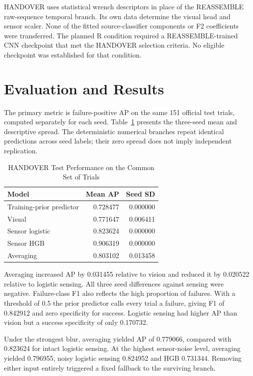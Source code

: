HANDOVER uses statistical wrench descriptors in place of the REASSEMBLE raw-sequence
temporal branch. Its own data determine the visual head and sensor scaler. None of the
fitted source-classifier components or F2 coefficients were transferred. The planned R
condition required a REASSEMBLE-trained CNN checkpoint that met the HANDOVER selection
criteria. No eligible checkpoint was established for that condition.

\section{Evaluation and Results}
The primary metric is failure-positive AP on the same 151 official test trials, computed
separately for each seed. Table~\ref{tab:handover-clean} presents the three-seed mean
and descriptive spread. The deterministic numerical branches repeat identical
predictions across seed labels; their zero spread does not imply independent
replication.

\begin{table}[htbp]
\caption{HANDOVER Test Performance on the Common Set of Trials}\label{tab:handover-clean}
\centering\small

\begin{tabular}{lrr}\hline Model&Mean AP&Seed SD\\\hline
Training-prior predictor&0.728477&0.000000\\
Visual&0.771647&0.006411\\
Sensor logistic&0.823624&0.000000\\
Sensor HGB&0.906319&0.000000\\
Averaging&0.803102&0.013458\\\hline
\end{tabular}
\end{table}

Averaging increased AP by 0.031455 relative to vision and reduced it by 0.020522
relative to logistic sensing. All three seed differences against sensing were negative.
Failure-class F1 also reflects the high proportion of failures. With a threshold of 0.5
the prior predictor calls every trial a failure, giving F1 of 0.842912 and zero
specificity for success. Logistic sensing had higher AP than vision but a success
specificity of only 0.170732.

Under the strongest blur, averaging yielded AP of 0.779066, compared with 0.823624 for
intact logistic sensing. At the highest sensor-noise level, averaging yielded 0.796955,
noisy logistic sensing 0.824952 and HGB 0.731344. Removing either input entirely
triggered a fixed fallback to the surviving branch.

